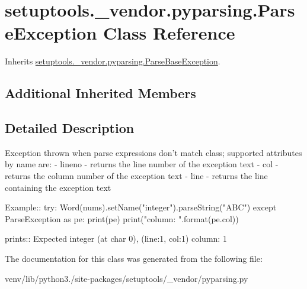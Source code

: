\hypertarget{classsetuptools_1_1__vendor_1_1pyparsing_1_1_parse_exception}{}\section{setuptools.\+\_\+vendor.\+pyparsing.\+Parse\+Exception Class Reference}
\label{classsetuptools_1_1__vendor_1_1pyparsing_1_1_parse_exception}


Inherits \hyperlink{classsetuptools_1_1__vendor_1_1pyparsing_1_1_parse_base_exception}{setuptools.\+\_\+vendor.\+pyparsing.\+Parse\+Base\+Exception}.

\subsection*{Additional Inherited Members}


\subsection{Detailed Description}
\begin{DoxyVerb}Exception thrown when parse expressions don't match class;
supported attributes by name are:
 - lineno - returns the line number of the exception text
 - col - returns the column number of the exception text
 - line - returns the line containing the exception text
    
Example::
    try:
        Word(nums).setName("integer").parseString("ABC")
    except ParseException as pe:
        print(pe)
        print("column: {}".format(pe.col))
        
prints::
   Expected integer (at char 0), (line:1, col:1)
    column: 1
\end{DoxyVerb}
 

The documentation for this class was generated from the following file\+:\begin{DoxyCompactItemize}
\item 
venv/lib/python3./site-\/packages/setuptools/\+\_\+vendor/pyparsing.\+py\end{DoxyCompactItemize}

